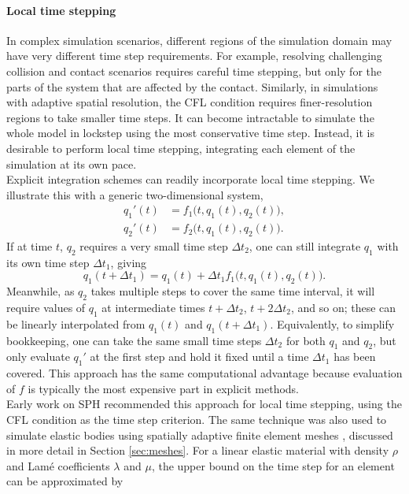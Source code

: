 \paragraph*{Local time stepping}
In complex simulation scenarios, different regions of the simulation domain may have very different time step requirements.
For example, resolving challenging collision and contact scenarios requires careful time stepping, but only for the parts of the system that are affected by the contact.
Similarly, in simulations with adaptive spatial resolution, the CFL condition requires finer-resolution regions to take smaller time steps.
It can become intractable to simulate the whole model in lockstep using the most conservative time step.
Instead, it is desirable to perform local time stepping, integrating each element of the simulation at its own pace.
\\
Explicit integration schemes can readily incorporate local time stepping.
We illustrate this with a generic two-dimensional system,
\begin{align}
  q_1'(t) &= f_1\big(t, q_1(t), q_2(t)\big), \\
  q_2'(t) &= f_2\big(t, q_1(t), q_2(t)\big).
\end{align}
If at time $t$, $q_2$ requires a very small time step $\Delta t_2$, one can still integrate $q_1$ with its own time step $\Delta t_1$, giving
\begin{equation}
  q_1(t+\Delta t_1) = q_1(t) + \Delta t_1 f_1\big(t, q_1(t), q_2(t)\big).
\end{equation}
Meanwhile, as $q_2$ takes multiple steps to cover the same time interval, it will require values of $q_1$ at intermediate times $t+\Delta t_2$, $t+2\Delta t_2$, and so on; these can be linearly interpolated from $q_1(t)$ and $q_1(t+\Delta t_1)$.
Equivalently, to simplify bookkeeping, one can take the same small time steps $\Delta t_2$ for both $q_1$ and $q_2$, but only evaluate $q_1'$ at the first step and hold it fixed until a time $\Delta t_1$ has been covered.
This approach has the same computational advantage because evaluation of $f$ is typically the most expensive part in explicit methods.
\\
Early work on SPH \cite{Desbrun1996,Desbrun1999} recommended this approach for local time stepping, using the CFL condition as the time step criterion.
The same technique was also used to simulate elastic bodies using spatially adaptive finite element meshes \cite{Debunne2001}, discussed in more detail in Section \ref{sec:meshes}.
For a linear elastic material with density $\rho$ and Lam\'e coefficients $\lambda$ and $\mu$, the upper bound on the time step for an element can be approximated by
